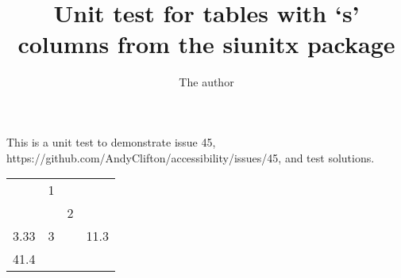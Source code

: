 \documentclass{article}
\title{Unit test for tables with `s' columns from the siunitx package}
\author{The author}
\begin{document}
\maketitle

This is a unit test to demonstrate issue 45, https://github.com/AndyClifton/accessibility/issues/45, and test solutions.


\begin{tabular}{SSSS}  
    & 1 &   &      \\
    &   & 2 &      \\
3.33 & 3 &   & 11.3 \\
41.4 &   &   & \\
\end{tabular}
\end{document}
